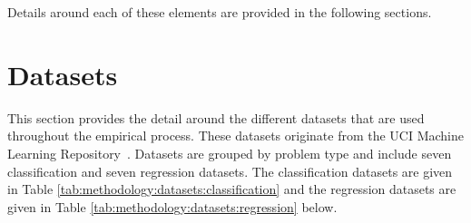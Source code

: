 Details around each of these elements are provided in the following sections.

\section{Datasets}
\label{sec:methodology:datasets}

This section provides the detail around the different datasets that are used throughout the empirical process. These datasets originate from the UCI Machine Learning Repository~\cite{ref:uci:2022}. Datasets are grouped by problem type and include seven classification and seven regression datasets. The classification datasets are given in Table \ref{tab:methodology:datasets:classification} and the regression datasets are given in Table \ref{tab:methodology:datasets:regression} below.

